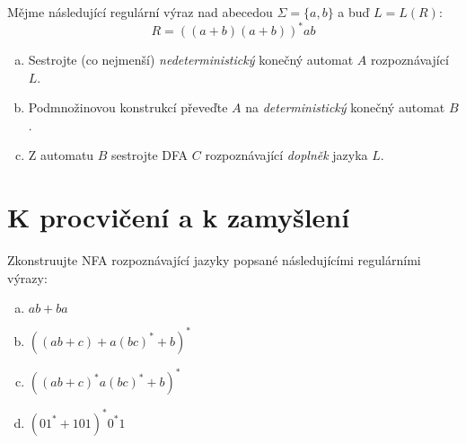 \documentclass[a4paper,12pt]{amsart}
\begin{document}
\begin{problem}
    
    Mějme následující regulární výraz nad abecedou $\Sigma=\{a,b\}$ a buď $L=L(R)$:
    \[
        R=((a + b)(a + b))^*ab
    \]
  
    \begin{enumerate}[(a)]
        \item Sestrojte (co nejmenší) \emph{nedeterministický} konečný automat $A$ rozpoznávající $L$.
        \item Podmnožinovou konstrukcí převeďte $A$ na \emph{deterministický} konečný automat $B$.
        \item Z automatu $B$ sestrojte DFA $C$  rozpoznávající \emph{doplněk} jazyka $L$.
    \end{enumerate}

\end{problem}


\section*{K procvičení a k zamyšlení}


\medskip\begin{problem}

    Zkonstruujte NFA rozpoznávající jazyky popsané následujícími regulárními výrazy:
    
    \vspace{-6pt}
    \begin{multicols}{2}
    
        \begin{enumerate}[(a)]\setlength\itemsep{0pt}
            \item $ab + ba$
            \item $((ab + c)+a(bc)^* + b)^*$
            \item $((ab + c)^*a(bc)^* + b)^*$
            \item $(01^* + 101)^*0^*1$
        \end{enumerate}
    
    \end{multicols}
    
\end{problem}
\end{document}
